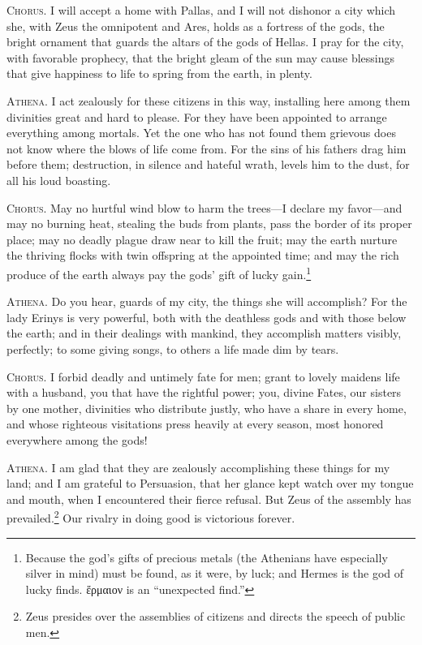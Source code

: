\documentclass[12pt]{article}
\begin{document}
\textsc{Chorus.} I will accept a home with Pallas, and I will not dishonor a city which she, with Zeus the omnipotent and Ares, holds as a fortress of the gods, the bright ornament that guards the altars of the gods of Hellas. I pray for the city, with favorable prophecy, that the bright gleam of the sun may cause blessings that give happiness to life to spring from the earth, in plenty.

\textsc{Athena.} I act zealously for these citizens in this way, installing here among them divinities great and hard to please. For they have been appointed to arrange everything among mortals. Yet the one who has not found them grievous does not know where the blows of life come from. For the sins of his fathers drag him before them; destruction, in silence and hateful wrath, levels him to the dust, for all his loud boasting.

\textsc{Chorus.} May no hurtful wind blow to harm the trees---I declare my favor---and may no burning heat, stealing the buds from plants, pass the border of its proper place; may no deadly plague draw near to kill the fruit; may the earth nurture the thriving flocks with twin offspring at the appointed time; and may the rich produce of the earth always pay the gods' gift of lucky gain.\footnote{Because the god's gifts of precious metals (the Athenians have especially silver in mind) must be found, as it were, by luck; and Hermes is the god of lucky finds. ἕρμαιον is an ``unexpected find.''}

\textsc{Athena.} Do you hear, guards of my city, the things she will accomplish? For the lady Erinys is very powerful, both with the deathless gods and with those below the earth; and in their dealings with mankind, they accomplish matters visibly, perfectly; to some giving songs, to others a life made dim by tears.

\textsc{Chorus.} I forbid deadly and untimely fate for men; grant to lovely maidens life with a husband, you that have the rightful power; you, divine Fates, our sisters by one mother, divinities who distribute justly, who have a share in every home, and whose righteous visitations press heavily at every season, most honored everywhere among the gods!

\textsc{Athena.} I am glad that they are zealously accomplishing these things for my land; and I am grateful to Persuasion, that her glance kept watch over my tongue and mouth, when I encountered their fierce refusal. But Zeus of the assembly has prevailed.\footnote{Zeus presides over the assemblies of citizens and directs the speech of public men.} Our rivalry in doing good is victorious forever.
\end{document}
